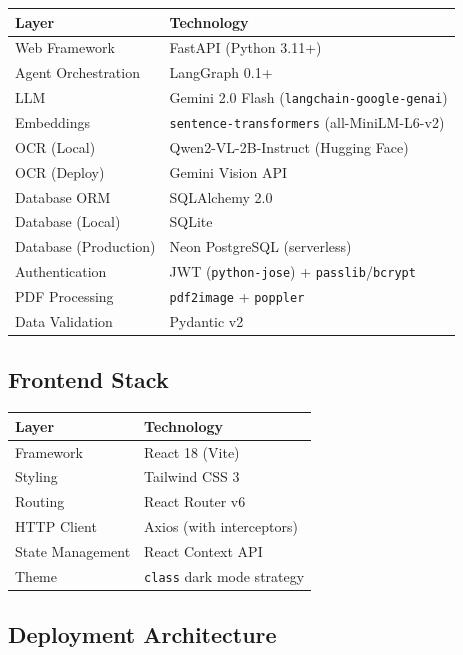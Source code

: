 \documentclass[12pt,a4paper]{article}
\begin{document}
\begin{center}
\begin{tabular}{ll}
\toprule
\textbf{Layer} & \textbf{Technology} \\
\midrule
Web Framework & FastAPI (Python 3.11+) \\
Agent Orchestration & LangGraph 0.1+ \\
LLM & Gemini 2.0 Flash (\texttt{langchain-google-genai}) \\
Embeddings & \texttt{sentence-transformers} (all-MiniLM-L6-v2) \\
OCR (Local) & Qwen2-VL-2B-Instruct (Hugging Face) \\
OCR (Deploy) & Gemini Vision API \\
Database ORM & SQLAlchemy 2.0 \\
Database (Local) & SQLite \\
Database (Production) & Neon PostgreSQL (serverless) \\
Authentication & JWT (\texttt{python-jose}) + \texttt{passlib}/\texttt{bcrypt} \\
PDF Processing & \texttt{pdf2image} + \texttt{poppler} \\
Data Validation & Pydantic v2 \\
\bottomrule
\end{tabular}
\end{center}

\subsection{Frontend Stack}

\begin{center}
\begin{tabular}{ll}
\toprule
\textbf{Layer} & \textbf{Technology} \\
\midrule
Framework & React 18 (Vite) \\
Styling & Tailwind CSS 3 \\
Routing & React Router v6 \\
HTTP Client & Axios (with interceptors) \\
State Management & React Context API \\
Theme & \texttt{class} dark mode strategy \\
\bottomrule
\end{tabular}
\end{center}

\subsection{Deployment Architecture}
\end{document}
